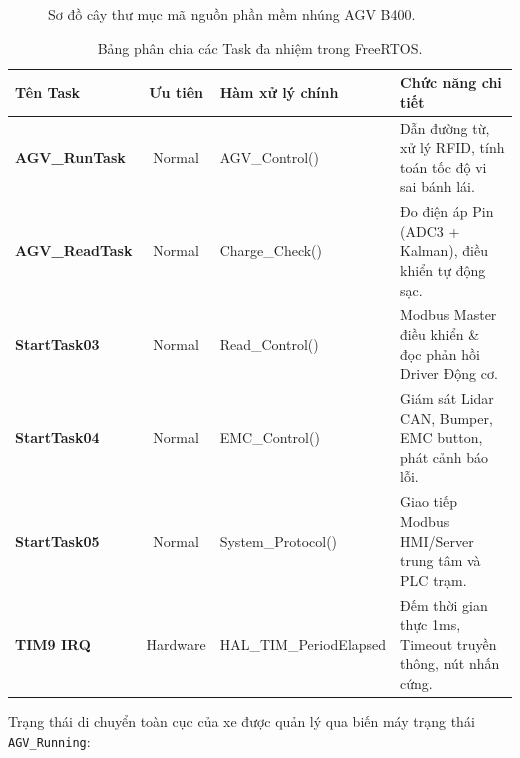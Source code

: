 \documentclass{article}
\begin{document}
\begin{figure}[H]
{%
}
\caption{Sơ đồ cây thư mục mã nguồn phần mềm nhúng AGV B400.}
\label{fig:firmware_arch}
\end{figure}

\begin{table}[!htbp]
\centering
\begin{tabularx}{\textwidth}{|>{\bfseries}l|c|l|X|}
\hline
\rowcolor{lightgray} Tên Task & Ưu tiên & Hàm xử lý chính & Chức năng chi tiết \\ \hline
AGV\_RunTask & Normal & AGV\_Control() & Dẫn đường từ, xử lý RFID, tính toán tốc độ vi sai bánh lái. \\ \hline
AGV\_ReadTask & Normal & Charge\_Check() & Đo điện áp Pin (ADC3 + Kalman), điều khiển tự động sạc. \\ \hline
StartTask03 & Normal & Read\_Control() & Modbus Master điều khiển \& đọc phản hồi Driver Động cơ. \\ \hline
StartTask04 & Normal & EMC\_Control() & Giám sát Lidar CAN, Bumper, EMC button, phát cảnh báo lỗi. \\ \hline
StartTask05 & Normal & System\_Protocol() & Giao tiếp Modbus HMI/Server trung tâm và PLC trạm. \\ \hline
TIM9 IRQ & Hardware & HAL\_TIM\_PeriodElapsed & Đếm thời gian thực 1ms, Timeout truyền thông, nút nhấn cứng. \\ \hline
\end{tabularx}
\caption{Bảng phân chia các Task đa nhiệm trong FreeRTOS.}
\label{tab:freertos_tasks_ch4}
\end{table}

Trạng thái di chuyển toàn cục của xe được quản lý qua biến máy trạng thái \texttt{AGV\_Running}:
\end{document}
